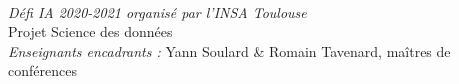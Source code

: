 			\begin{minipage}{0.4\textwidth}
            
            \hfill\\
            \hfill\\
            \hfill\\
            \hfill\\
            \hfill\\
            \hfill\\
            \hfill\\
            \hfill\\
            \hfill\\
            \hfill\\\hfill\\\hfill\\\hfill\\\hfill\\\hfill\\\hfill\\\hfill\\\hfill\\\hfill\\\hfill\\\hfill\\\hfill\\\hfill\\\hfill\\\hfill\\\hfill\\\hfill\\
            \hfill\\\hfill\\\hfill\\\hfill\\\hfill\\\hfill\\
			\begin{flushright} \large
			\emph{Défi IA 2020-2021 organisé par l'INSA Toulouse} \\
			Projet Science des données\\
			\emph{Enseignants encadrants :}
            		Yann Soulard \& Romain Tavenard, maîtres de conférences
		\end{flushright}
        
	\end{minipage}\\[2 cm]

\tableofcontents






\printendnotes



